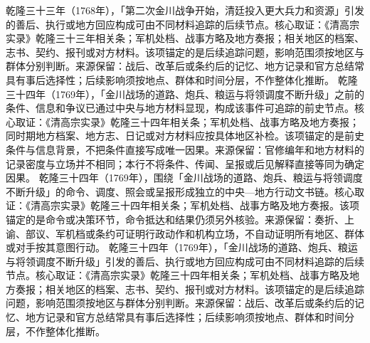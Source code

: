 乾隆三十三年（1768年），「第二次金川战争开始，清廷投入更大兵力和资源」引发的善后、执行或地方回应构成可由不同材料追踪的后续节点。核心取证：《清高宗实录》乾隆三十三年相关条；军机处档、战事方略及地方奏报；相关地区的档案、志书、契约、报刊或对方材料。该项锚定的是后续追踪问题，影响范围须按地区与群体分别判断。来源保留：战后、改革后或条约后的记忆、地方记录和官方总结常具有事后选择性；后续影响须按地点、群体和时间分层，不作整体化推断。
乾隆三十四年（1769年），「金川战场的道路、炮兵、粮运与将领调度不断升级」之前的条件、信息和争议已通过中央与地方材料显现，构成该事件可追踪的前史节点。核心取证：《清高宗实录》乾隆三十四年相关条；军机处档、战事方略及地方奏报；同时期地方档案、地方志、日记或对方材料应按具体地区补检。该项锚定的是前史条件与信息背景，不把条件直接写成唯一因果。来源保留：官修编年和地方材料的记录密度与立场并不相同；本行不将条件、传闻、呈报或后见解释直接等同为确定因果。
乾隆三十四年（1769年），围绕「金川战场的道路、炮兵、粮运与将领调度不断升级」的命令、调度、照会或呈报形成独立的中央—地方行动文书链。核心取证：《清高宗实录》乾隆三十四年相关条；军机处档、战事方略及地方奏报。该项锚定的是命令或决策环节，命令抵达和结果仍须另外核验。来源保留：奏折、上谕、部议、军机档或条约可证明行政动作和机构立场，不自动证明所有地区、群体或对手按其意图行动。
乾隆三十四年（1769年），「金川战场的道路、炮兵、粮运与将领调度不断升级」引发的善后、执行或地方回应构成可由不同材料追踪的后续节点。核心取证：《清高宗实录》乾隆三十四年相关条；军机处档、战事方略及地方奏报；相关地区的档案、志书、契约、报刊或对方材料。该项锚定的是后续追踪问题，影响范围须按地区与群体分别判断。来源保留：战后、改革后或条约后的记忆、地方记录和官方总结常具有事后选择性；后续影响须按地点、群体和时间分层，不作整体化推断。
